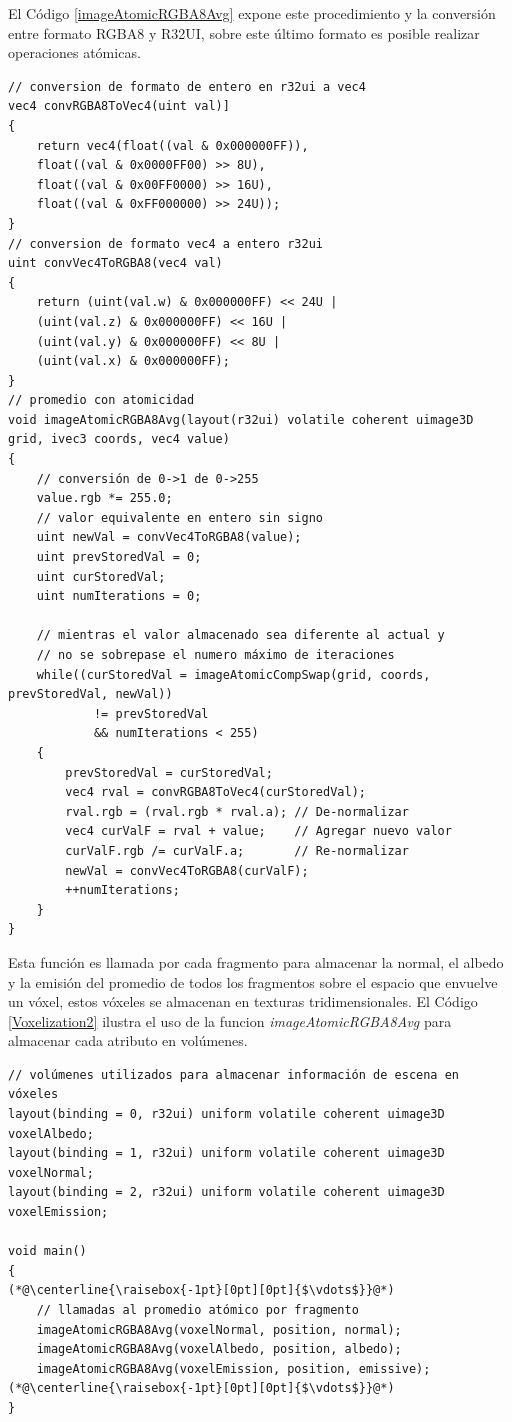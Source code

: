 El Código \ref{imageAtomicRGBA8Avg} expone este procedimiento y la conversión entre formato RGBA8 y R32UI, sobre este último formato es posible realizar operaciones atómicas.
\\
\begin{lstlisting}[caption={Conversion entre RGBA8 y R32UI y promedio incremental.}, label=imageAtomicRGBA8Avg]
// conversion de formato de entero en r32ui a vec4
vec4 convRGBA8ToVec4(uint val)]
{
    return vec4(float((val & 0x000000FF)), 
    float((val & 0x0000FF00) >> 8U), 
    float((val & 0x00FF0000) >> 16U), 
    float((val & 0xFF000000) >> 24U));
}
// conversion de formato vec4 a entero r32ui
uint convVec4ToRGBA8(vec4 val)
{
    return (uint(val.w) & 0x000000FF) << 24U | 
    (uint(val.z) & 0x000000FF) << 16U | 
    (uint(val.y) & 0x000000FF) << 8U | 
    (uint(val.x) & 0x000000FF);
}
// promedio con atomicidad
void imageAtomicRGBA8Avg(layout(r32ui) volatile coherent uimage3D grid, ivec3 coords, vec4 value)
{
    // conversión de 0->1 de 0->255
    value.rgb *= 255.0;
    // valor equivalente en entero sin signo
    uint newVal = convVec4ToRGBA8(value);
    uint prevStoredVal = 0;
    uint curStoredVal;
    uint numIterations = 0;

    // mientras el valor almacenado sea diferente al actual y 
    // no se sobrepase el numero máximo de iteraciones
    while((curStoredVal = imageAtomicCompSwap(grid, coords, prevStoredVal, newVal)) 
            != prevStoredVal
            && numIterations < 255)
    {
        prevStoredVal = curStoredVal;
        vec4 rval = convRGBA8ToVec4(curStoredVal);
        rval.rgb = (rval.rgb * rval.a); // De-normalizar
        vec4 curValF = rval + value;    // Agregar nuevo valor
        curValF.rgb /= curValF.a;       // Re-normalizar
        newVal = convVec4ToRGBA8(curValF);
        ++numIterations;
    }
}
\end{lstlisting}

Esta función es llamada por cada fragmento para almacenar la normal, el albedo y la emisión del promedio de todos los fragmentos sobre el espacio que envuelve un vóxel, estos vóxeles se almacenan en texturas tridimensionales. El Código \ref{Voxelization2} ilustra el uso de la funcion \emph{imageAtomicRGBA8Avg} para almacenar cada atributo en volúmenes.
\\
\begin{lstlisting}[caption={Composición de fragmentos y vóxeles}, label=Voxelization2]
// volúmenes utilizados para almacenar información de escena en vóxeles
layout(binding = 0, r32ui) uniform volatile coherent uimage3D voxelAlbedo;
layout(binding = 1, r32ui) uniform volatile coherent uimage3D voxelNormal;
layout(binding = 2, r32ui) uniform volatile coherent uimage3D voxelEmission;

void main()
{
(*@\centerline{\raisebox{-1pt}[0pt][0pt]{$\vdots$}}@*)
    // llamadas al promedio atómico por fragmento
    imageAtomicRGBA8Avg(voxelNormal, position, normal);
    imageAtomicRGBA8Avg(voxelAlbedo, position, albedo);
    imageAtomicRGBA8Avg(voxelEmission, position, emissive);
(*@\centerline{\raisebox{-1pt}[0pt][0pt]{$\vdots$}}@*)
}
\end{lstlisting}

